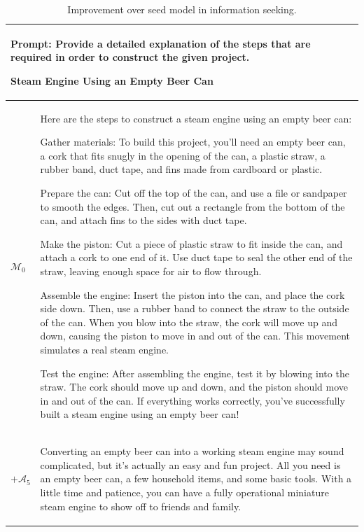 \begin{table}[t]
   
  \caption{Improvement over seed model in information seeking.
  \label{tab:example_outputs_2}
  }
  \centering
  \begin{tabular}{p{1em}l}
    \toprule
\multicolumn{2}{l}{\begin{minipage}{40em}
\textbf{Prompt:}
Provide a detailed explanation of the steps that are required in order to construct the given project.

Steam Engine Using an Empty Beer Can\end{minipage}} \\ 
\midrule
  $\mathcal{M}_0$ & \begin{minipage}{45em}
\begin{lmttfont}
 Here are the steps to construct a steam engine using an empty beer can:

Gather materials: To build this project, you'll need an empty beer can, a cork that fits snugly in the opening of the can, a plastic straw, a rubber band, duct tape, and fins made from cardboard or plastic.

Prepare the can: Cut off the top of the can, and use a file or sandpaper to smooth the edges. Then, cut out a rectangle from the bottom of the can, and attach fins to the sides with duct tape.

Make the piston: Cut a piece of plastic straw to fit inside the can, and attach a cork to one end of it. Use duct tape to seal the other end of the straw, leaving enough space for air to flow through.

Assemble the engine: Insert the piston into the can, and place the cork side down. Then, use a rubber band to connect the straw to the outside of the can. When you blow into the straw, the cork will move up and down, causing the piston to move in and out of the can. This movement simulates a real steam engine.

Test the engine: After assembling the engine, test it by blowing into the straw. The cork should move up and down, and the piston should move in and out of the can. If everything works correctly, you've successfully built a steam engine using an empty beer can!
\end{lmttfont}
 \end{minipage}\\
\midrule
$+ \mathcal{A}_5$  & \begin{minipage}{45em}
\begin{lmttfont}
Converting an empty beer can into a working steam engine may sound complicated, but it's actually an easy and fun project. All you need is an empty beer can, a few household items, and some basic tools. With a little time and patience, you can have a fully operational miniature steam engine to show off to friends and family.


\end{lmttfont}
\end{minipage}
\end{tabular}
\end{table}
